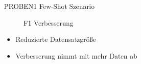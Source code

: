 \documentclass[10pt, compress]{beamer}
\begin{document}
\begin{frame}{PROBEN1 Few-Shot Szenario}
\begin{minipage}[c]{.5\textwidth}
\begin{figure}[hbt]
{}
  \caption{F1 Verbesserung}
  \end{figure}
  \end{minipage}
  \hfill
  \begin{minipage}[c]{.45\textwidth}
    \begin{itemize}
      \item Reduzierte Datensatzgröße
      \item Verbesserung nimmt mit mehr Daten ab
    \end{itemize}
  \end{minipage}
\end{frame}
\end{document}

